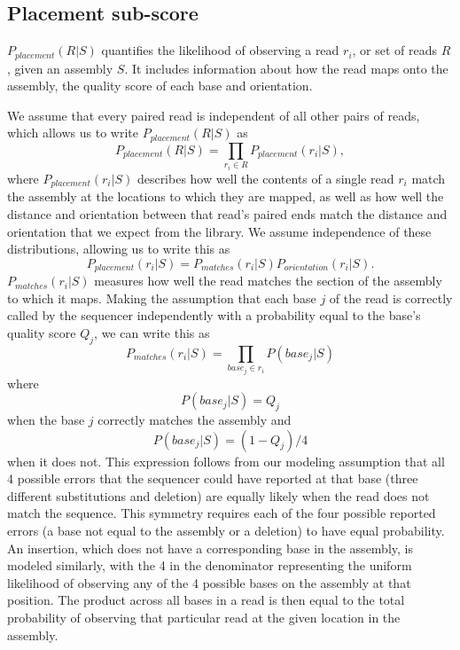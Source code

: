 \documentclass[phd,tocprelim]{cornell}
\begin{document}
\subsection{Placement sub-score} %
\label{sub:Placement sub-score}

$P_{placement}(R|S)$ quantifies the likelihood of observing a read $r_{i}$, or set of reads $R$, given an assembly $S$. It includes information about how the read maps onto the assembly, the quality score of each base and orientation.

We assume that every paired read is independent of all other pairs of reads, which allows us to write $P_{placement}(R|S)$ as
\begin{equation}
    P_{placement}(R|S) = \prod_{r_{i} \in R} P_{placement}\left(r_{i}|S\right),
\end{equation}
where $P_{placement}\left(r_{i}|S\right)$ describes how well the contents of a single read $r_{i}$ match the assembly at the locations to which they are mapped, as well as how well the distance and orientation between that read’s paired ends match the distance and orientation that we expect from the library.  We assume independence of these distributions, allowing us to write this as
\begin{equation}
    P_{placement}\left(r_{i}|S\right) = P_{matches}\left(r_{i}|S\right)P_{orientation}\left(r_{i}|S\right). 
\end{equation}
$P_{matches}\left(r_{i}|S\right)$ measures how well the read matches the section of the assembly to which it maps. Making the assumption that each base $j$ of the read is correctly called by the sequencer independently with a probability equal to the base’s quality score $Q_{j}$, we can write this as
\begin{equation}
    P_{matches}\left(r_{i}|S\right) = \prod_{base_{j} \in r_{i}} P\left(base_{j}|S\right)
\end{equation}
where
\begin{equation}
    P\left(base_{j}|S\right) = Q_{j}
\end{equation}
when the base $j$ correctly matches the assembly and
\begin{equation}
    P\left(base_{j}|S\right) = (1-Q_{j})/4
\end{equation}
when it does not. This expression follows from our modeling assumption that all 4 possible errors that the sequencer could have reported at that base (three different substitutions and deletion) are equally likely when the read does not match the sequence. This symmetry requires each of the four possible reported errors (a base not equal to the assembly or a deletion) to have equal probability. An insertion, which does not have a corresponding base in the assembly, is modeled similarly, with the 4 in the denominator representing the uniform likelihood of observing any of the 4 possible bases on the assembly at that position. The product across all bases in a read is then equal to the total probability of observing that particular read at the given location in the assembly.
\end{document}
